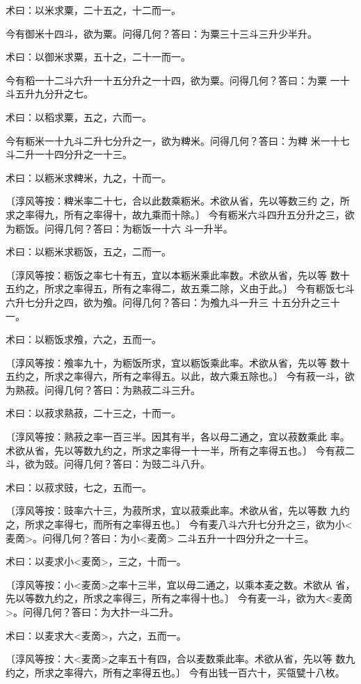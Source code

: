 \documentclass[a4paper,12pt,UTF8,twoside]{ctexbook}
\begin{document}
术曰：以米求粟，二十五之，十二而一。

今有御米十四斗，欲为粟。问得几何？答曰：为粟三十三斗三升少半升。

术曰：以御米求粟，五十之，二十一而一。

今有稻一十二斗六升一十五分升之一十四，欲为粟。问得几何？答曰：为粟 一十斗五升九分升之七。

术曰：以稻求粟，五之，六而一。

今有粝米一十九斗二升七分升之一，欲为粺米。问得几何？答曰：为粺 米一十七斗二升一十四分升之一十三。

术曰：以粝米求粺米，九之，十而一。

〔淳风等按：粺米率二十七，合以此数乘粝米。术欲从省，先以等数三约 之，所求之率得九，所有之率得十，故九乘而十除。〕 今有粝米六斗四升五分升之三，欲为粝饭。问得几何？答曰：为粝饭一十六 斗一升半。

术曰：以粝米求粝饭，五之，二而一。

〔淳风等按：粝饭之率七十有五，宜以本粝米乘此率数。术欲从省，先以等 数十五约之，所求之率得五，所有之率得二，故五乘二除，义由于此。〕 今有粝饭七斗六升七分升之四，欲为飧。问得几何？答曰：为飧九斗一升三 十五分升之三十一。

术曰：以粝饭求飧，六之，五而一。

〔淳风等按：飧率九十，为粝饭所求，宜以粝饭乘此率。术欲从省，先以等 数十五约之，所求之率得六，所有之率得五。以此，故六乘五除也。〕 今有菽一斗，欲为熟菽。问得几何？答曰：为熟菽二斗三升。

术曰：以菽求熟菽，二十三之，十而一。

〔淳风等按：熟菽之率一百三半。因其有半，各以母二通之，宜以菽数乘此 率。术欲从省，先以等数九约之，所求之率得一十一半，所有之率得五也。〕 今有菽二斗，欲为豉。问得几何？答曰：为豉二斗八升。

术曰：以菽求豉，七之，五而一。

〔淳风等按：豉率六十三，为菽所求，宜以菽乘此率。术欲从省，先以等数 九约之，所求之率得七，而所有之率得五也。〕 今有麦八斗六升七分升之三，欲为小<麦啇>。问得几何？答曰：为小<麦啇> 二斗五升一十四分升之一十三。

术曰：以麦求小<麦啇>，三之，十而一。

〔淳风等按：小<麦啇>之率十三半，宜以母二通之，以乘本麦之数。术欲从 省，先以等数九约之，所求之率得三，所有之率得十也。〕 今有麦一斗，欲为大<麦啇>。问得几何？答曰：为大抃一斗二升。

术曰：以麦求大<麦啇>，六之，五而一。

〔淳风等按：大<麦啇>之率五十有四，合以麦数乘此率。术欲从省，先以等 数九约之，所求之率得六，所有之率得五也。〕 今有出钱一百六十，买瓴甓十八枚。
\end{document}
